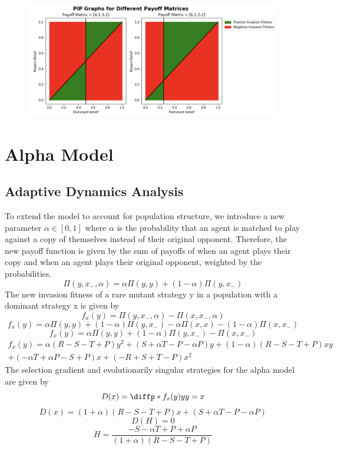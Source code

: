 \documentclass[]{llncs}
\begin{document}
\begin{figure}
\centering
\includegraphics[width=15cm]{images/pip_basic}
\end{figure}


\section{Alpha Model}

\subsection{Adaptive Dynamics Analysis}

To extend the model to account for population structure, we introduce a new parameter $\alpha \in [0, 1]$ where $\alpha$ is the probability that an agent is matched to play against a copy of themselves instead of their original opponent. Therefore, the new payoff function is given by the sum of payoffs of when an agent plays their copy and when an agent plays their original opponent, weighted by the probabilities.
\[ 
\Pi ( y, x_{-}, \alpha ) = \alpha \Pi ( y, y) + (1-\alpha) \Pi ( y, x_{-} )
\]
The new invasion fitness of a rare mutant strategy y in a population with a dominant strategy x is given by 
\[
f_x(y) = \Pi ( y, x_{-}, \alpha ) - \Pi ( x, x_{-}, \alpha )
\]
\[
f_x(y) = \alpha \Pi ( y, y) + (1-\alpha) \Pi ( y, x_{-} ) - \alpha \Pi ( x, x) - (1-\alpha) \Pi ( x,  x_{-} )
\]
\[
f_x(y) = \alpha \Pi ( y, y) + (1-\alpha) \Pi ( y, x_{-} ) - \Pi ( x,  x_{-} )
\]
\begin{multline}
f_x(y) = \alpha (R-S-T+P) y^2 +(S + \alpha T - P - \alpha P) y + (1-\alpha) (R-S-T+P) x y \\+ (-\alpha T + \alpha P - S + P) x + (-R+S+T-P) x^2
\end{multline}
The selection gradient and evolutionarily singular strategies for the alpha model are given by 
\[
D(x) = \diffp*{f_x(y)}{y}{y=x}
\]
\[
D(x) = (1+\alpha) (R-S-T+P) x + (S + \alpha T - P - \alpha P) 
\]
\[
D(H) = 0
\]
\[
H = \frac{-S - \alpha T + P + \alpha P}{(1+\alpha)(R-S-T+P)}
\]
\end{document}
